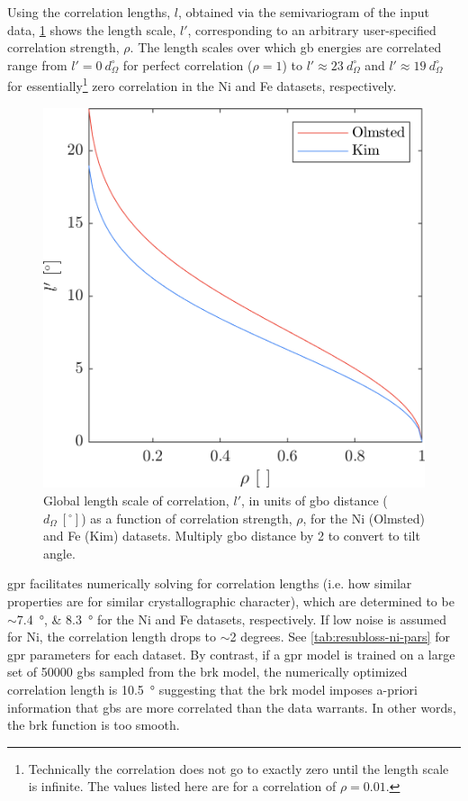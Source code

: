 \documentclass[final,twocolumn,12pt]{elsarticle}
\begin{document}
	Using the correlation lengths, $l$, obtained via the semivariogram of the input data, \cref{fig:correlationlengthvsrho} shows the length scale, $l'$, corresponding to an arbitrary user-specified correlation strength, $\rho$. The length scales over which \gls{gb} energies are correlated range from $l' = 0\ d_{\Omega}^{\circ}$ for perfect correlation ($\rho = 1$) to $l' \approx 23\ d_{\Omega}^{\circ}$ and $l' \approx 19\ d_{\Omega}^{\circ}$ for essentially\footnote{Technically the correlation does not go to exactly zero until the length scale is infinite. The values listed here are for a correlation of $\rho = 0.01$.} zero correlation in the Ni and Fe datasets, respectively.
	\begin{figure}
	    \centering
	    \includegraphics[scale=1]{figures/CorrelationLengthVsRho.png}
	    \caption{Global length scale of correlation, $l'$, in units of \gls{gbo} distance ($d_\Omega\ [{}^{\circ}]$) as a function of correlation strength, $\rho$, for the Ni (Olmsted) and Fe (Kim) datasets. Multiply \gls{gbo} distance by 2 to convert to tilt angle.}
	    \label{fig:correlationlengthvsrho}
	\end{figure}
	
	\Gls{gpr} facilitates numerically solving for correlation lengths (i.e. how similar properties are for similar crystallographic character), which are determined to be $\sim$\SIlist{7.4;8.3}{\degree} for the Ni and Fe datasets, respectively. If low noise is assumed for Ni, the correlation length drops to $\sim$2 degrees. See \cref{tab:resubloss-ni-pars} for \gls{gpr} parameters for each dataset. By contrast, if a \gls{gpr} model is trained on a large set of \num{50000} \glspl{gb} sampled from the \gls{brk} model, the numerically optimized correlation length is \SI{10.5}{\degree} suggesting that the \gls{brk} model imposes a-priori information that \glspl{gb} are more correlated than the data warrants. In other words, the \gls{brk} function is too smooth.
	
\end{document}
